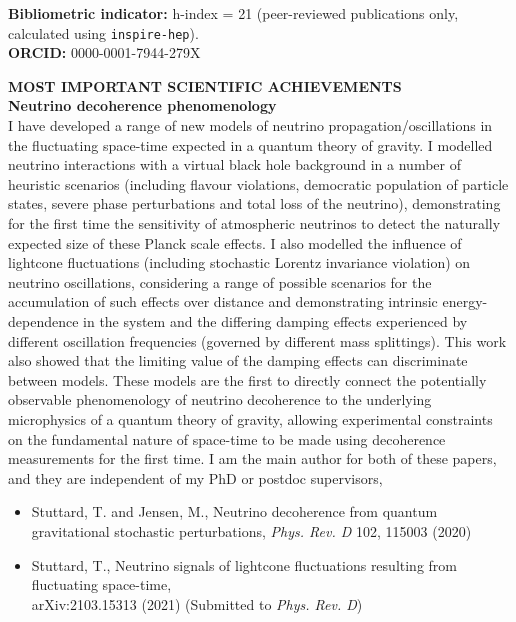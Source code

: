 \documentclass[a4paper,11pt]{article}
\renewcommand{\smallskip} {\vspace{0.1in}}
\begin{document}
\textbf{Bibliometric indicator:} h-index = 21 (peer-reviewed publications only, calculated using \texttt{inspire-hep}). \\
\textbf{ORCID:} 0000-0001-7944-279X

\vspace{0.3cm}

\textbf{MOST IMPORTANT SCIENTIFIC ACHIEVEMENTS ~~\hrulefill}\smallskip\\
%
{\bf Neutrino decoherence phenomenology} \\ 
I have developed a range of new models of neutrino propagation/oscillations in the fluctuating space-time expected in a quantum theory of gravity. I modelled neutrino interactions with a virtual black hole background in a number of heuristic scenarios  (including flavour violations, democratic population of particle states, severe phase perturbations and total loss of the neutrino), demonstrating for the first time the sensitivity of atmospheric neutrinos to detect the naturally expected size of these Planck scale effects. I also modelled the influence of lightcone fluctuations (including stochastic Lorentz invariance violation) on neutrino oscillations, considering a range of possible scenarios for the accumulation of such effects over distance and demonstrating intrinsic energy-dependence in the system and the differing damping effects experienced by different oscillation frequencies (governed by different mass splittings). This work also showed that the limiting value of the damping effects can discriminate between models. These models are the first to directly connect the potentially observable phenomenology of neutrino decoherence to the underlying microphysics of a quantum theory of gravity, allowing experimental constraints on the fundamental nature of space-time to be made using decoherence measurements for the first time. I am the main author for both of these papers, and they are independent of my PhD or postdoc supervisors,

\begin{itemize}
  \item Stuttard, T. and Jensen, M., Neutrino decoherence from quantum gravitational stochastic perturbations, \textit{Phys. Rev. D} 102, 115003 (2020)
  \item Stuttard, T., Neutrino signals of lightcone fluctuations resulting from fluctuating space-time, \\ arXiv:2103.15313 (2021) (Submitted to \textit{Phys. Rev. D})
\end{itemize}
\end{document}
